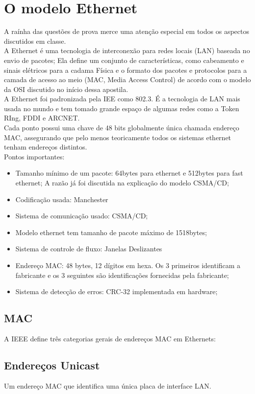 \documentclass{article}
\begin{document}
\section{O modelo Ethernet} 
A raínha das questões de prova merce uma atenção especial em todos os aspectos
discutidos em classe.\\
A Ethernet é uma tecnologia de interconexão para redes locais (LAN) baseada no
envio de pacotes; Ela define um conjunto de características, como cabeamento e
sinais elétricos para a cadama Física e o formato dos pacotes e protocolos para
a camada de acesso ao meio (MAC, Media Access Control) de acordo com o modelo da
OSI discutido no início dessa apostila.\\
A Ethernet foi padronizada pela IEE como 802.3. É a tecnologia de LAN mais usada
no mundo e tem tomado grande espaço de algumas redes como a Token RIng, FDDI e
ARCNET.\\
Cada ponto possui uma chave de 48 bits globalmente única chamada endereço MAC,
assegurando que pelo menos teoricamente todos os sistemas ethernet tenham
endereços distintos.\\

Pontos importantes:

\begin{itemize}
	\item Tamanho mínimo de um pacote: 64bytes para ethernet e 512bytes para
fast ethernet; A razão já foi discutida na explicação do modelo CSMA/CD;
	\item Codificação usada: Manchester
	\item Sistema de comunicação usado: CSMA/CD;
	\item Modelo ethernet tem tamanho de pacote máximo de 1518bytes;
	\item Sistema de controle de fluxo: Janelas Deslizantes
	\item Endereço MAC: 48 bytes, 12 dígitos em hexa. Os 3 primeiros
identificam a fabricante e os 3 seguintes são identificações fornecidas pela
fabricante; 
	\item Sistema de detecção de erros: CRC-32 implementada em hardware;
\end{itemize}

\subsection{MAC}
A IEEE define três categorias gerais de endereços MAC em Ethernets:

\subsection{Endereços Unicast}
Um endereço MAC que identifica uma única placa de interface LAN.
\end{document}
